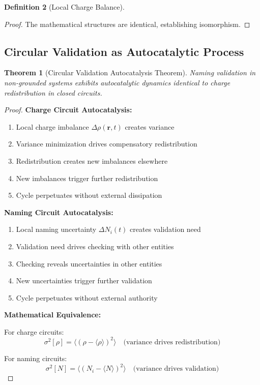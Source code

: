\documentclass[12pt,a4paper]{article}
\theoremstyle{plain}
\newtheorem{theorem}{Theorem}[section]
\theoremstyle{definition}
\newtheorem{definition}[theorem]{Definition}
\theoremstyle{remark}
\begin{document}
\begin{definition}[Local Charge Balance]
\begin{proof}
The mathematical structures are identical, establishing isomorphism.
\end{proof}

\subsection{Circular Validation as Autocatalytic Process}

\begin{theorem}[Circular Validation Autocatalysis Theorem]
Naming validation in non-grounded systems exhibits autocatalytic dynamics identical to charge redistribution in closed circuits.
\end{theorem}

\begin{proof}
\textbf{Charge Circuit Autocatalysis:}
\begin{enumerate}
\item Local charge imbalance $\Delta \rho(\mathbf{r},t)$ creates variance
\item Variance minimization drives compensatory redistribution
\item Redistribution creates new imbalances elsewhere
\item New imbalances trigger further redistribution
\item Cycle perpetuates without external dissipation
\end{enumerate}

\textbf{Naming Circuit Autocatalysis:}
\begin{enumerate}
\item Local naming uncertainty $\Delta N_i(t)$ creates validation need
\item Validation need drives checking with other entities
\item Checking reveals uncertainties in other entities
\item New uncertainties trigger further validation
\item Cycle perpetuates without external authority
\end{enumerate}

\textbf{Mathematical Equivalence:}

For charge circuits:
\begin{equation}
\sigma^2[\rho] = \langle (\rho - \langle \rho \rangle)^2 \rangle \quad \text{(variance drives redistribution)}
\end{equation}

For naming circuits:
\begin{equation}
\sigma^2[N] = \langle (N_i - \langle N \rangle)^2 \rangle \quad \text{(variance drives validation)}
\end{equation}


\end{proof}
\end{definition}
\end{document}
